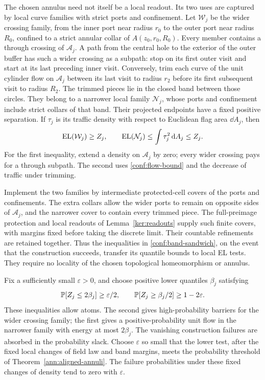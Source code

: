 The chosen annulus need not itself be a local readout.  Its two uses
are captured by local curve families with strict ports and confinement.
Let \(\mathcal W_j\) be the wider crossing family, from the inner
port near radius \(r_0\) to the outer port near radius \(R_0\),
confined to a strict annular collar of \(A(z_0,r_0,R_0)\).
Every member contains a through crossing of \(\mathcal A_j\).
A path from the central hole to the exterior of the outer buffer
has such a wider crossing as a subpath: stop on its first outer
visit and start at its last preceding inner visit.  Conversely, trim each curve
of the unit cylinder flow on \(\mathcal A_j\) between its last visit
to radius \(r_2\) before its first subsequent visit to radius \(R_2\).
The trimmed pieces lie in the closed band between those circles.
They belong to a narrower local family \(\mathcal N_j\), whose
ports and confinement include strict collars of that band.  Their
projected endpoints have a fixed positive separation.  If \(\tau_j\)
is its traffic density with respect to Euclidean flag area
\(\dd A_j\), then
\begin{equation}
 \EL(\mathcal W_j)\ge Z_j,
 \qquad
 \EL(\mathcal N_j)\le\int\tau_j^2\,\dd A_j\le Z_j.
 \label{conf:band-sandwich}
\end{equation}
For the first inequality, extend a density on \(\mathcal A_j\) by
zero; every wider crossing pays for a through subpath.  The second
uses \eqref{conf:flow-bound} and the decrease of traffic under trimming.

Implement the two families by intermediate protected-cell covers of
the ports and confinements.  The extra collars allow the wider ports
to remain on opposite sides of \(\mathcal A_j\), and the narrower
cover to contain every trimmed piece.  The full-preimage protection
and local readouts of Lemma~\ref{ker:readouts} supply such finite
covers, with margins fixed before taking the discrete limit.  Their
countable refinements are retained together.  Thus the inequalities
in \eqref{conf:band-sandwich}, on the event that the construction
succeeds, transfer its quantile bounds to local EL tests.  They require
no locality of the chosen topological homeomorphism or annulus.

Fix a sufficiently small \(\varepsilon>0\), and choose positive
lower quantiles \(\beta_j\) satisfying
\begin{equation}
 \PP[Z_j\le2\beta_j]\ge\varepsilon/2,
 \qquad
 \PP[Z_j\ge\beta_j/2]\ge1-2\varepsilon.
 \label{conf:quantiles}
\end{equation}
These inequalities allow atoms.  The second gives high-probability
barriers for the wider crossing family; the first gives a
positive-probability unit flow in the narrower family with energy
at most \(2\beta_j\).  The vanishing construction failures are
absorbed in the probability slack.  Choose \(\varepsilon\) so small
that the lower test, after the fixed local changes of field law and
band margins, meets the probability threshold of
Theorem~\ref{ann:aligned-annuli}.  The failure probabilities under
these fixed changes of density tend to zero with \(\varepsilon\).

